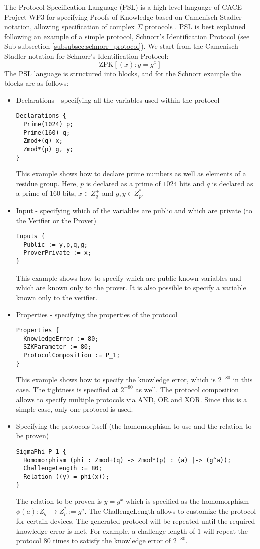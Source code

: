 The Protocol Specification Language (PSL) is a high level language of
CACE Project WP3 for specifying Proofs of Knowledge based on
Camenisch-Stadler notation, allowing specification of complex $\Sigma$
protocols \cite{CACE, yaczk}. PSL is best explained following an
example of a simple protocol, Schnorr's Identification Protocol (see
Sub-subsection \ref{subsubsec:schnorr_protocol}). We start from the
Camenisch-Stadler notation for Schnorr's Identification Protocol:
\[
  \textrm{ZPK}\left[ (x): y = g^x \right]
\]
The PSL language is structured into blocks, and for the Schnorr
example the blocks are as follows:
\begin{itemize}
\item Declarations - specifying all the variables used within
  the protocol
\begin{lstlisting}[language=PSL]
Declarations {
  Prime(1024) p;
  Prime(160) q;
  Zmod+(q) x;
  Zmod*(p) g, y;
}
\end{lstlisting}
  This example shows how to declare prime numbers as well as elements
  of a residue group. Here, $p$ is declared as a prime of $1024$ bits
  and $q$ is declared as a prime of $160$ bits, $x \in Z_q^+$ and $g,
  y \in Z_p^*$.
\item Input - specifying which of the variables are public and which
  are private (to the Verifier or the Prover)
\begin{lstlisting}[language=PSL]
Inputs {
  Public := y,p,q,g;
  ProverPrivate := x;
}
\end{lstlisting}
  This example shows how to specify which are public known variables
  and which are known only to the prover. It is also possible to
  specify a variable known only to the verifier.
\item Properties - specifying the properties of the protocol
\begin{lstlisting}[language=PSL]
Properties {
  KnowledgeError := 80;
  SZKParameter := 80;
  ProtocolComposition := P_1;
}
\end{lstlisting}
  This example shows how to specify the knowledge error, which is
  $2^{-80}$ in this case. The tightness is specified at $2^{-80}$ as
  well. The protocol composition allows to specify multiple protocols
  via AND, OR and XOR. Since this is a simple case, only one protocol is
  used.

\item Specifying the protocols itself (the homomorphism to
  use and the relation to be proven)
\begin{lstlisting}[language=PSL]
SigmaPhi P_1 {
  Homomorphism (phi : Zmod+(q) -> Zmod*(p) : (a) |-> (g^a));
  ChallengeLength := 80;
  Relation ((y) = phi(x));
}
\end{lstlisting}
  The relation to be proven is $y = g^x$ which is specified as the
  homomorphism $\phi(a) : Z_q^+ \rightarrow Z_p^* := g^a$. The
  ChallengeLength allows to customize the protocol for certain
  devices.  The generated protocol will be repeated until the required
  knowledge error is met. For example, a challenge length of $1$ will
  repeat the protocol $80$ times to satisfy the knowledge error of
  $2^{-80}$.

\end{itemize}

